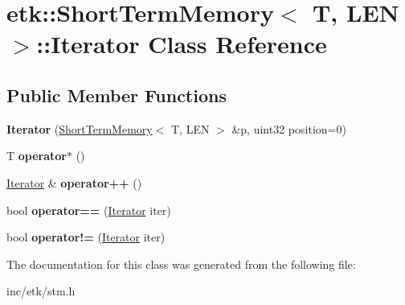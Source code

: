 \hypertarget{classetk_1_1_short_term_memory_1_1_iterator}{\section{etk\-:\-:Short\-Term\-Memory$<$ T, L\-E\-N $>$\-:\-:Iterator Class Reference}
\label{classetk_1_1_short_term_memory_1_1_iterator}
}
\subsection*{Public Member Functions}
\begin{DoxyCompactItemize}
\item 
\hypertarget{classetk_1_1_short_term_memory_1_1_iterator_abcfe12dc44a7f81335898956df39a653}{{\bfseries Iterator} (\hyperlink{classetk_1_1_short_term_memory}{Short\-Term\-Memory}$<$ T, L\-E\-N $>$ \&p, uint32 position=0)}\label{classetk_1_1_short_term_memory_1_1_iterator_abcfe12dc44a7f81335898956df39a653}

\item 
\hypertarget{classetk_1_1_short_term_memory_1_1_iterator_ae0dad866d5927d8ee3d9717a178427e8}{T {\bfseries operator$\ast$} ()}\label{classetk_1_1_short_term_memory_1_1_iterator_ae0dad866d5927d8ee3d9717a178427e8}

\item 
\hypertarget{classetk_1_1_short_term_memory_1_1_iterator_ae5d8621f94f142690d5d2bd50aa3d8af}{\hyperlink{classetk_1_1_short_term_memory_1_1_iterator}{Iterator} \& {\bfseries operator++} ()}\label{classetk_1_1_short_term_memory_1_1_iterator_ae5d8621f94f142690d5d2bd50aa3d8af}

\item 
\hypertarget{classetk_1_1_short_term_memory_1_1_iterator_a18c7ce8f9a1b98ffec26f6be66fa54b0}{bool {\bfseries operator==} (\hyperlink{classetk_1_1_short_term_memory_1_1_iterator}{Iterator} iter)}\label{classetk_1_1_short_term_memory_1_1_iterator_a18c7ce8f9a1b98ffec26f6be66fa54b0}

\item 
\hypertarget{classetk_1_1_short_term_memory_1_1_iterator_aee6649ed22232dae992b18a2386a8893}{bool {\bfseries operator!=} (\hyperlink{classetk_1_1_short_term_memory_1_1_iterator}{Iterator} iter)}\label{classetk_1_1_short_term_memory_1_1_iterator_aee6649ed22232dae992b18a2386a8893}

\end{DoxyCompactItemize}


The documentation for this class was generated from the following file\-:\begin{DoxyCompactItemize}
\item 
inc/etk/stm.\-h\end{DoxyCompactItemize}
